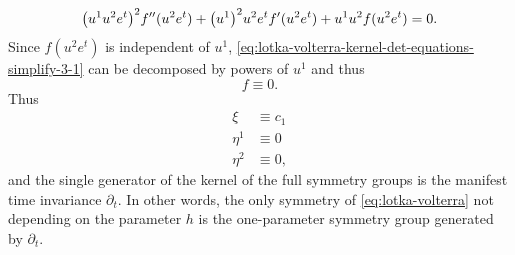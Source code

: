 \begin{equation}\label{eq:lotka-volterra-kernel-det-equations-simplify-3-1}
  \qty(u^1 u^2 e^t)^2 f''(u^2 e^t) + \qty(u^1)^2 u^2 e^t f'(u^2 e^t) + u^1 u^2 f(u^2 e^t) = 0.
\end{equation}
Since \(f(u^2 e^t)\) is independent of \(u^1\), \cref{eq:lotka-volterra-kernel-det-equations-simplify-3-1} can be decomposed by powers of \(u^1\) and thus
\begin{equation}
  f \equiv 0.
\end{equation}
Thus
\begin{align}
  \xi &\equiv c_1\\
  \eta^1 &\equiv 0\\
  \eta^2 &\equiv 0,
\end{align}
and the single generator of the kernel of the full symmetry groups is the manifest time invariance \(\partial_t\).
In other words, the only symmetry of \cref{eq:lotka-volterra} not depending on the parameter \(h\) is the one-parameter symmetry group generated by \(\partial_t\).
